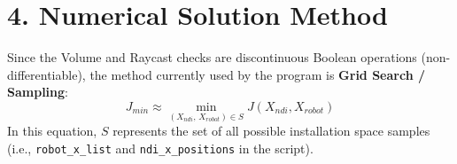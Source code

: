 \documentclass[12pt, a4paper]{article}
\begin{document}
\section*{4. Numerical Solution Method}
Since the Volume and Raycast checks are discontinuous Boolean operations (non-differentiable), the method currently used by the program is \textbf{Grid Search / Sampling}:
\begin{equation}
    J_{min} \approx \min_{(X_{ndi}, \, X_{robot}) \in S} J(X_{ndi}, X_{robot})
\end{equation}
In this equation, $S$ represents the set of all possible installation space samples (i.e., \texttt{robot\_x\_list} and \texttt{ndi\_x\_positions} in the script). %
\end{document}

